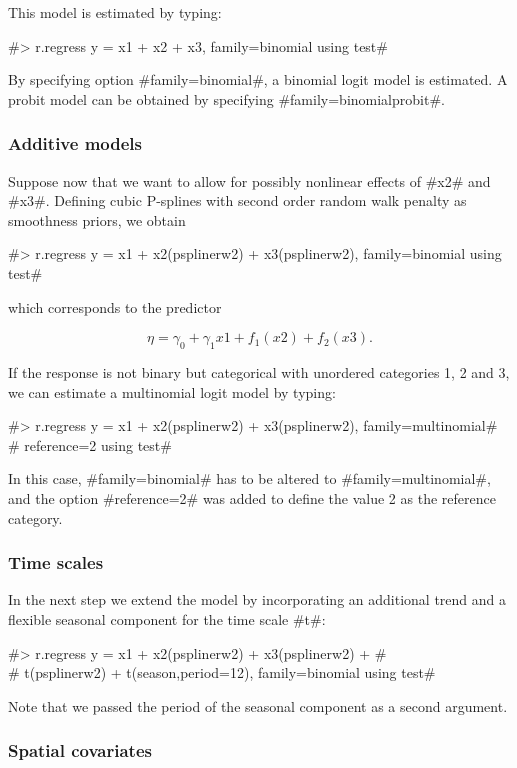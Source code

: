 This model is estimated by typing:

#> r.regress y = x1 + x2 + x3, family=binomial using test#

By specifying option #family=binomial#, a binomial logit model is
estimated. A probit model can be obtained by specifying
#family=binomialprobit#.

\subsubsection*{Additive models}

Suppose now that we want to allow for possibly nonlinear effects
of #x2# and #x3#. Defining cubic P-splines with second order
random walk penalty as smoothness priors, we obtain

 #> r.regress y = x1 + x2(psplinerw2) + x3(psplinerw2), family=binomial using test#

which corresponds to the predictor

$$
\eta = \gamma_0 + \gamma_1 x1 + f_1(x2) + f_2(x3).
$$

If the response is not binary but categorical with unordered
categories 1, 2 and 3, we can estimate a multinomial logit model by
typing:

 #> r.regress y = x1 + x2(psplinerw2) + x3(psplinerw2), family=multinomial#\\
 #  reference=2 using test#

In this case, #family=binomial# has to be altered to
#family=multinomial#, and the option #reference=2# was added to
define the value 2 as the reference category.

\subsubsection*{Time scales}

In the next step we extend the model by incorporating an additional
trend and a flexible seasonal component for the time scale #t#:

 #> r.regress y = x1 + x2(psplinerw2) + x3(psplinerw2) +  #\\
 #  t(psplinerw2) + t(season,period=12), family=binomial using test#

Note that we passed the period of the seasonal component as a
second argument.

\subsubsection*{Spatial covariates}

